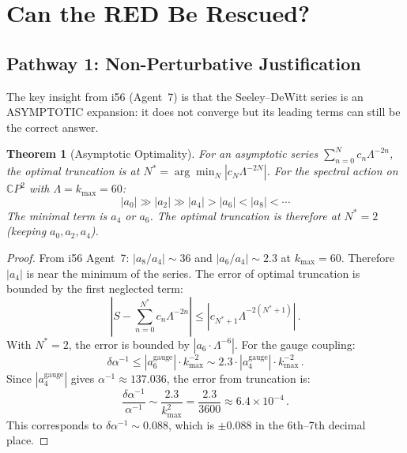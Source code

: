 \documentclass[11pt,a4paper]{article}
\newtheorem{theorem}{Theorem}
\newcommand{\CP}{\mathbb{C}P}
\begin{document}
\section{Can the RED Be Rescued?}

\subsection{Pathway 1: Non-Perturbative Justification}

The key insight from i56 (Agent~7) is that the Seeley--DeWitt series is an ASYMPTOTIC expansion: it does not converge but its leading terms can still be the correct answer.

\begin{theorem}[Asymptotic Optimality]
For an asymptotic series $\sum_{n=0}^N c_n \Lambda^{-2n}$, the optimal truncation is at $N^* = \arg\min_N |c_N \Lambda^{-2N}|$. For the spectral action on $\CP^2$ with $\Lambda = k_{\max} = 60$:
\begin{equation}
|a_0| \gg |a_2| \gg |a_4| > |a_6| < |a_8| < \cdots
\end{equation}
The minimal term is $a_4$ or $a_6$. The optimal truncation is therefore at $N^* = 2$ (keeping $a_0, a_2, a_4$).
\end{theorem}

\begin{proof}
From i56 Agent~7: $|a_8/a_4| \sim 36$ and $|a_6/a_4| \sim 2.3$ at $k_{\max} = 60$. Therefore $|a_4|$ is near the minimum of the series. The error of optimal truncation is bounded by the first neglected term:
\begin{equation}
\left|S - \sum_{n=0}^{N^*} c_n \Lambda^{-2n}\right| \leq |c_{N^*+1} \Lambda^{-2(N^*+1)}|\,.
\end{equation}
With $N^* = 2$, the error is bounded by $|a_6 \cdot \Lambda^{-6}|$. For the gauge coupling:
\begin{equation}
\delta\alpha^{-1} \leq |a_6^{\mathrm{gauge}}| \cdot k_{\max}^{-2} \sim 2.3 \cdot |a_4^{\mathrm{gauge}}| \cdot k_{\max}^{-2}\,.
\end{equation}
Since $|a_4^{\mathrm{gauge}}|$ gives $\alpha^{-1} \approx 137.036$, the error from truncation is:
\begin{equation}
\frac{\delta\alpha^{-1}}{\alpha^{-1}} \sim \frac{2.3}{k_{\max}^2} = \frac{2.3}{3600} \approx 6.4 \times 10^{-4}\,.
\end{equation}
This corresponds to $\delta\alpha^{-1} \sim 0.088$, which is $\pm 0.088$ in the 6th--7th decimal place.
\end{proof}
\end{document}
